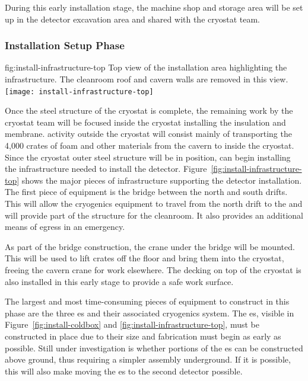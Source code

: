 During this early installation stage, the machine shop and  storage area will be set up in the detector excavation area and shared with the cryostat team. 

\subsubsection{Installation Setup Phase}
\label{sec:fdsp-tc-inst-setup}

\begin{dunefigure}{fig:install-infrastructure-top}
  {Top view of the installation area highlighting the infrastructure. The cleanroom roof and cavern walls are removed in this view.}
\texttt{[image: install-infrastructure-top]}
\end{dunefigure}

Once the steel structure of the cryostat is complete, the remaining work by the  cryostat team will be focused inside the cryostat installing the insulation and membrane.  
 activity outside the cryostat will consist mainly of
transporting the 4,000 crates of foam and other materials from the cavern to inside the cryostat. 
Since the cryostat outer steel structure will be in position,  can 
begin installing the infrastructure needed to install the detector. 
Figure~\ref{fig:install-infrastructure-top} shows the major pieces of infrastructure supporting the detector installation.
The first piece of equipment is the bridge between the north and south drifts. 
This will allow the cryogenics equipment to travel from the north drift to the  and will provide part of the structure for the cleanroom. It also provides an additional means of egress in an emergency.

As part of the bridge construction, the crane under the bridge will be mounted. This %
will be used to lift crates off the floor and bring them into the cryostat, freeing the cavern crane for work elsewhere. The decking on top of the cryostat is also installed in this early stage to provide a safe work surface. %

The largest and most time-consuming pieces of equipment to  construct in this phase are the three \coldbox{}es and their associated cryogenics system. 
The \coldbox{}es, visible in Figure~\ref{fig:install-coldbox} and \ref{fig:install-infrastructure-top}, must be constructed in place due to their size and %
fabrication must %
begin as early as possible. Still under investigation is whether %
portions of the \coldbox{}es can be constructed %
above ground, thus requiring a simpler assembly underground. %
If it is possible, this will also make moving the \coldbox{}es to the second detector possible. 
 
